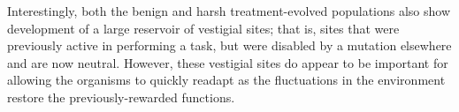 Interestingly, both the benign and harsh treatment-evolved populations also show development of a large reservoir of vestigial sites; that is, sites that were previously active in performing a task, but were disabled by a mutation elsewhere and are now neutral.  However, these vestigial sites do appear to be important for allowing the organisms to quickly readapt as the fluctuations in the environment restore the previously-rewarded functions.


